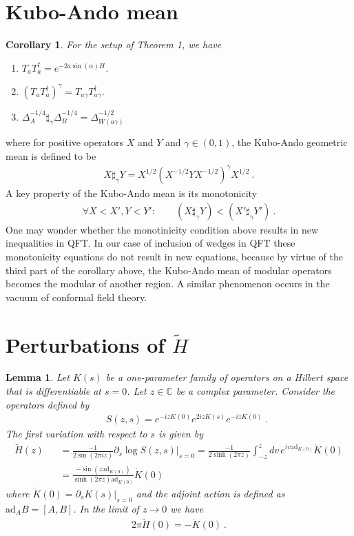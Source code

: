 \documentclass[a4paper,11pt]{article}
\newtheorem{lemma}[theorem]{Lemma}
\newtheorem{corollary}[theorem]{Corollary}
\theoremstyle{definition}
\newcommand{\nn}{\nonumber}
\newcommand{\lb}{\left(}
\newcommand{\rb}{\right)}
\newcommand{\p}{\partial}
\newcommand{\ad}{\text{ad}}
\begin{document}
\section{Kubo-Ando mean}

\begin{corollary}
For the setup of Theorem 1, we have
\begin{enumerate}
    \item  $T_a T_a^\dagger=e^{-2a\sin(\alpha) H}$.
    \item $(T_a T_a^\dagger)^\gamma=T_{a\gamma} T_{a\gamma}^\dagger$.
    \item $\Delta_A^{-1/4}\sharp_\gamma \Delta_B^{-1/4}=\Delta_{W(a\gamma)}^{-1/2}$ 
\end{enumerate}
\end{corollary}
where for positive operators $X$ and $Y$ and $\gamma\in (0,1)$, the Kubo-Ando geometric mean is defined to be 
\begin{eqnarray}
    X\sharp_\gamma Y=X^{1/2}\lb X^{-1/2}YX^{-1/2} \rb^\gamma X^{1/2}\ .
\end{eqnarray}
A key property of the Kubo-Ando mean is its monotonicity
\begin{eqnarray}
    \forall X<X',Y<Y':\qquad (X\sharp_\gamma Y)<(X'\sharp_\gamma Y')\ .
\end{eqnarray}
One may wonder whether the monotinicity condition above results in new inequalities in QFT.
In our case of inclusion of wedges in QFT these monotonicity equations do not result in new equations,  because by virtue of the third part of the corollary above, the Kubo-Ando mean of modular operators becomes the modular of another region. A similar phenomenon occurs in the vacuum of conformal field theory.

\section{Perturbations of $\tilde{H}$ \label{app:Ht}}
\begin{lemma}\label{Htilde}
Let $K(s)$ be a one-parameter family of operators on a Hilbert space that is differentiable at $s=0$. Let $z \in \mathbb{C}$ be a complex parameter. Consider the operators defined by
\begin{eqnarray}
    &&S(z,s)=e^{-iz K(0)} e^{2iz K(s)} e^{-iz K(0)}\ .
\end{eqnarray}
The first variation with respect to $s$ is given by
    \begin{eqnarray}
        \tilde{H}(z) &&=\frac{{-}1}{2\sin(2\pi iz)}\p_s\log S(z,s)\Big|_{s=0}= \frac{{-}1}{2\sinh(2\pi z)}\int_{-z}^{z} dv \, e^{i v \ad_{K(0)}} \dot{K}(0)\nn\\
        &&=\frac{{-}\sin(z \ad_{K(0)})}{\sinh(2\pi z)\ad_{K(0)}} \dot{K}(0)
    \end{eqnarray}
    where $\dot{K}(0) = \p_s K(s)|_{s=0}$ and the adjoint action is defined as $\ad_A B = [A, B]$. In the limit of $z\to 0$ we have
    \begin{eqnarray}
        2\pi\tilde{H}(0)={-}\dot{K}(0)\ .
    \end{eqnarray}
\end{lemma}
\end{document}
